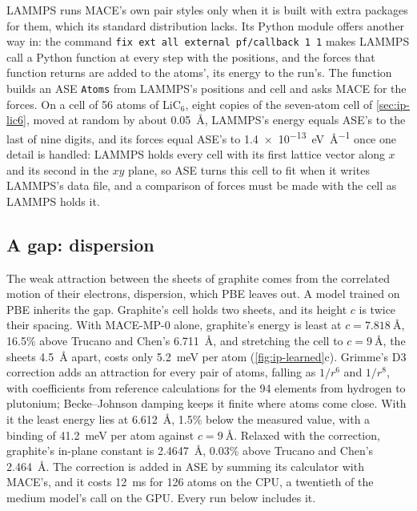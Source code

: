 LAMMPS runs MACE's own pair styles only when it is built with extra
packages for them, which its standard distribution lacks. Its Python
module offers another way in: the command \texttt{fix ext all external
pf/callback 1 1} makes LAMMPS call a Python function at every step with
the positions, and the forces that function returns are added to the
atoms', its energy to the run's. The function builds an ASE \texttt{Atoms}
from LAMMPS's positions and cell and asks MACE for the forces. On a cell
of 56 atoms of LiC$_6$, eight copies of the seven-atom cell of
\cref{sec:ip-lic6}, moved at random by about \SI{0.05}{\angstrom},
LAMMPS's energy equals ASE's to the last of nine digits, and its forces
equal ASE's to \SI{1.4e-13}{\electronvolt\per\angstrom} once one detail is
handled: LAMMPS holds every cell with its first lattice vector along
$x$ and its second in the $xy$ plane, so ASE turns this cell to fit when
it writes LAMMPS's data file, and a comparison of forces must be made
with the cell as LAMMPS holds it.

\subsection*{A gap: dispersion}

The weak attraction between the sheets of graphite comes from the
correlated motion of their electrons, dispersion, which PBE leaves out.
A model trained on PBE inherits the gap. Graphite's cell holds two
sheets, and its height $c$ is twice their spacing. With MACE-MP-0 alone,
graphite's energy is least at $c = \SI{7.818}{\angstrom}$, 16.5\% above
Trucano and Chen's \SI{6.711}{\angstrom}\cite{TrucanoChen1975}, and
stretching the cell to $c = \SI{9}{\angstrom}$, the sheets
\SI{4.5}{\angstrom} apart, costs only \SI{5.2}{\milli\electronvolt} per
atom (\cref{fig:ip-learned}c). Grimme's D3 correction\cite{Grimme2010}
adds an attraction for every pair of atoms, falling as $1/r^6$ and
$1/r^8$, with coefficients from reference calculations for the 94
elements from hydrogen to plutonium; Becke--Johnson
damping\cite{Grimme2011} keeps it finite where atoms come close. With it
the least energy lies at \SI{6.612}{\angstrom}, 1.5\% below the measured
value, with a binding of \SI{41.2}{\milli\electronvolt} per atom against
$c = \SI{9}{\angstrom}$. Relaxed with the correction, graphite's in-plane
constant is \SI{2.4647}{\angstrom}, 0.03\% above Trucano and Chen's
\SI{2.464}{\angstrom}. The correction is added in ASE by summing its
calculator with MACE's, and it costs \SI{12}{\milli\second} for 126
atoms on the CPU, a twentieth of the medium model's call on the GPU. Every run below includes it.

